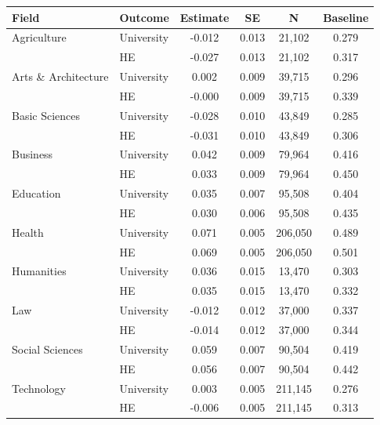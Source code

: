 \begin{tabular}{llcccc}
\toprule
Field & Outcome & Estimate & SE & N & Baseline \\
\midrule
Agriculture & University & -0.012 & 0.013 &    21,102 & 0.279 \\
 & HE & -0.027 & 0.013 &    21,102 & 0.317 \\
\midrule
Arts \& Architecture & University &  0.002 & 0.009 &    39,715 & 0.296 \\
 & HE & -0.000 & 0.009 &    39,715 & 0.339 \\
\midrule
Basic Sciences & University & -0.028 & 0.010 &    43,849 & 0.285 \\
 & HE & -0.031 & 0.010 &    43,849 & 0.306 \\
\midrule
Business & University &  0.042 & 0.009 &    79,964 & 0.416 \\
 & HE &  0.033 & 0.009 &    79,964 & 0.450 \\
\midrule
Education & University &  0.035 & 0.007 &    95,508 & 0.404 \\
 & HE &  0.030 & 0.006 &    95,508 & 0.435 \\
\midrule
Health & University &  0.071 & 0.005 &   206,050 & 0.489 \\
 & HE &  0.069 & 0.005 &   206,050 & 0.501 \\
\midrule
Humanities & University &  0.036 & 0.015 &    13,470 & 0.303 \\
 & HE &  0.035 & 0.015 &    13,470 & 0.332 \\
\midrule
Law & University & -0.012 & 0.012 &    37,000 & 0.337 \\
 & HE & -0.014 & 0.012 &    37,000 & 0.344 \\
\midrule
Social Sciences & University &  0.059 & 0.007 &    90,504 & 0.419 \\
 & HE &  0.056 & 0.007 &    90,504 & 0.442 \\
\midrule
Technology & University &  0.003 & 0.005 &   211,145 & 0.276 \\
 & HE & -0.006 & 0.005 &   211,145 & 0.313 \\
\bottomrule
\end{tabular}
